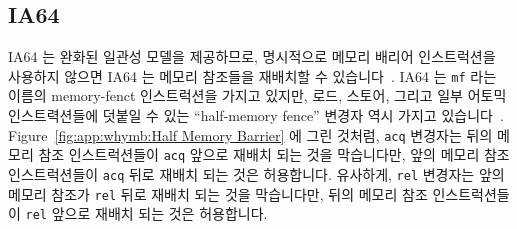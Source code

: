 \subsection{IA64}

IA64 는 완화된 일관성 모델을 제공하므로, 명시적으로 메모리 배리어 인스트럭션을
사용하지 않으면 IA64 는 메모리 참조들을 재배치할 수
있습니다~\cite{IntelItanium02v2}.
IA64 는 {\tt mf} 라는 이름의 memory-fenct 인스트럭션을 가지고 있지만, 로드,
스토어, 그리고 일부 어토믹 인스트력션들에 덧붙일 수 있는 ``half-memory fence''
변경자 역시 가지고 있습니다~\cite{IntelItanium02v3}.
Figure~\ref{fig:app:whymb:Half Memory Barrier} 에 그린 것처럼, {\tt acq}
변경자는 뒤의 메모리 참조 인스트럭션들이 {\tt acq} 앞으로 재배치 되는 것을
막습니다만, 앞의 메모리 참조인스트럭션들이 {\tt acq} 뒤로 재배치 되는 것은
허용합니다.
유사하게, {\tt rel} 변경자는 앞의 메모리 참조가 {\tt rel} 뒤로 재배치 되는 것을
막습니다만, 뒤의 메모리 참조 인스트럭션들이 {\tt rel} 앞으로 재배치 되는 것은
허용합니다.

